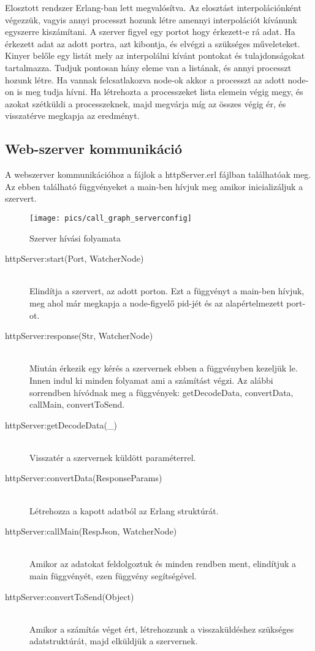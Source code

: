 Elosztott rendszer Erlang-ban lett megvalósítva. Az elosztást interpolációnként végezzük, vagyis annyi processzt hozunk létre amennyi interpolációt kívánunk egyszerre kiszámítani. \newline
A szerver figyel egy portot hogy érkezett-e rá adat. Ha érkezett adat az adott portra, azt kibontja, és elvégzi a szükséges műveleteket. Kinyer belőle egy listát mely az interpolálni kívánt pontokat és tulajdonságokat tartalmazza. \newline
Tudjuk pontosan hány eleme van a listának, és annyi processzt hozunk létre. Ha vannak felcsatlakozva node-ok akkor a processzt az adott node-on is meg tudja hívni.
Ha létrehozta a processzeket lista elemein végig megy, és azokat szétküldi a processzeknek, majd megvárja míg az összes végig ér, és visszatérve megkapja az eredményt.
\subsection{Web-szerver kommunikáció}
	A webszerver kommunikációhoz a fájlok a httpServer.erl fájlban találhatóak meg. Az ebben található függvényeket a main-ben hívjuk meg amikor inicializáljuk a szervert.

	\begin{figure}[h]
		\texttt{[image: pics/call\_graph\_serverconfig]}
		\centering
		\caption{Szerver hívási folyamata\label{fig:call_graph_serverconfig}}
	\end{figure}

	\begin{description}
	\item[httpServer:start(Port, WatcherNode)] 
		\hfill \\
		Elindítja a szervert, az adott porton. \newline
		Ezt a függvényt a main-ben hívjuk, meg ahol már megkapja a node-figyelő pid-jét és az alapértelmezett port-ot.
	\item[httpServer:response(Str, WatcherNode)] \hfill \\ 
		Miután érkezik egy kérés a szervernek ebben a függvényben kezeljük le. Innen indul ki minden folyamat ami a számítást végzi. \newline 
		Az alábbi sorrendben hívódnak meg a függvények: \newline
		getDecodeData, convertData, callMain, convertToSend.
	\item[httpServer:getDecodeData(\_)] \hfill \\ 
		Visszatér a szervernek küldött paraméterrel.
	\item[httpServer:convertData(ResponseParams)] \hfill \\ 
		Létrehozza a kapott adatból az Erlang struktúrát.
	\item[httpServer:callMain(RespJson, WatcherNode)] \hfill \\ 
		Amikor az adatokat feldolgoztuk és minden rendben ment, elindítjuk a main függvényét, ezen függvény segítségével.
	\item[httpServer:convertToSend(Object)] \hfill \\ 
		Amikor a számítás véget ért, létrehozzunk a visszaküldéshez szükséges adatstruktúrát, majd elküldjük a szervernek.
	\end{description}
